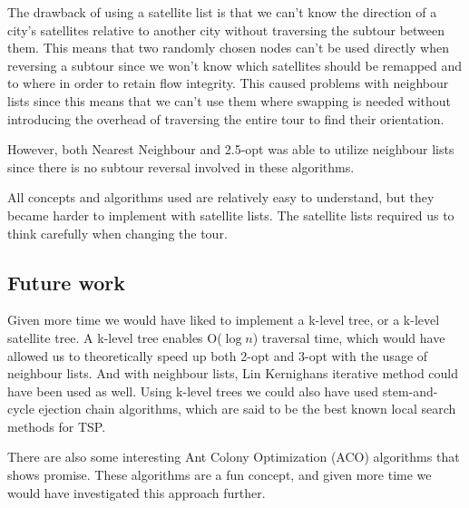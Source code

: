 \documentclass[paper=a4, fontsize=11pt,numbers=endperiod]{scrartcl} %
\numberwithin{equation}{section} %
\numberwithin{figure}{section} %
\numberwithin{table}{section} %
\begin{document}

The drawback of using a satellite list is that we can't know the direction of a city's satellites relative to another city without traversing the subtour between them.
This means that two randomly chosen nodes can't be used directly when reversing a subtour since we won't know which satellites should be remapped and to where in order to retain flow integrity.
This caused problems with neighbour lists since this means that we can't use them where swapping is needed without introducing the overhead of traversing the entire tour to find their orientation.

However, both Nearest Neighbour and 2.5-opt was able to utilize neighbour lists since there is no subtour reversal involved in these algorithms.

All concepts and algorithms used are relatively easy to understand, but they became harder to implement with satellite lists.
The satellite lists required us to think carefully when changing the tour.


\subsection{Future work}

Given more time we would have liked to implement a k-level tree, or a k-level satellite tree.
A k-level tree enables O($\log{n}$) traversal time, which would have allowed us to theoretically speed up both 2-opt and 3-opt with the usage of neighbour lists. And with neighbour lists, Lin Kernighans iterative method could have been used as well. Using k-level trees we could also have used stem-and-cycle ejection chain algorithms, which are said to be the best known local search methods for TSP.\cite{stem-cycle}

There are also some interesting Ant Colony Optimization (ACO) algorithms that shows promise. These algorithms are a fun concept, and given more time we would have investigated this approach further. \cite{ACO}

\end{document}

